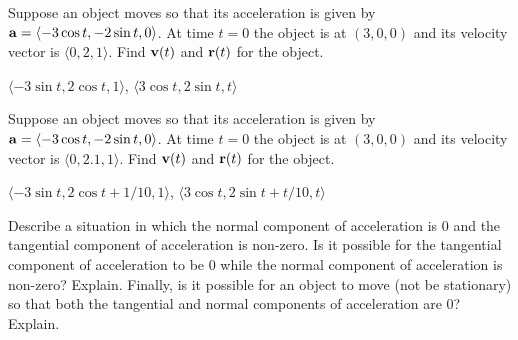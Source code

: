 \begin{enumialphparenastyle}
\begin{ex}
Suppose an object moves so that its acceleration is given by
${\bf a}=\langle -3\cos t,-2\sin t,0\rangle$. At time $t=0$ the object
is at $(3,0,0)$ and its velocity vector is $\langle
0,2,1\rangle$. Find ${\bf v}(t)$ and ${\bf r}(t)$ for the object.
\begin{sol}
	$\langle -3\sin t,2\cos t,1\rangle$,
	$\langle 3\cos t, 2\sin t,t\rangle$
\end{sol}
\end{ex}

\begin{ex}
Suppose an object moves so that its acceleration is given by
${\bf a}=\langle -3\cos t,-2\sin t,0\rangle$. At time $t=0$ the object
is at $(3,0,0)$ and its velocity vector is $\langle
0,2.1,1\rangle$. Find ${\bf v}(t)$ and ${\bf r}(t)$ for the object.
\begin{sol}
	$\langle -3\sin t,2\cos t+1/10,1\rangle$,
	$\langle 3\cos t, 2\sin t+t/10,t\rangle$
\end{sol}
\end{ex}

\begin{ex}
Describe a situation in which the normal component of
acceleration is 0 and the tangential component of acceleration is
non-zero. Is it possible for the tangential component of acceleration
to be 0 while the normal component of acceleration is non-zero? Explain.
Finally, is it possible for an object to move (not be stationary)
so that both the tangential and normal components of acceleration are 0?
Explain.
\end{ex}

\end{enumialphparenastyle}